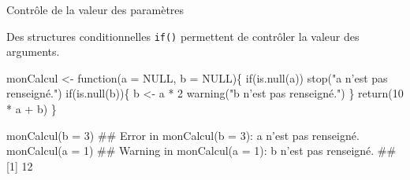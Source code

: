 \documentclass[12pt,ignorenonframetext,handout,]{beamer}
\newenvironment{Shaded}{}{}
\newcommand{\ControlFlowTok}[1]{\textcolor[rgb]{0.00,0.00,1.00}{#1}}
\newcommand{\DataTypeTok}[1]{#1}
\newcommand{\DecValTok}[1]{#1}
\newcommand{\KeywordTok}[1]{\textcolor[rgb]{0.00,0.00,1.00}{#1}}
\newcommand{\NormalTok}[1]{#1}
\newcommand{\OperatorTok}[1]{#1}
\newcommand{\OtherTok}[1]{\textcolor[rgb]{1.00,0.25,0.00}{#1}}
\newcommand{\StringTok}[1]{\textcolor[rgb]{0.00,0.50,0.50}{#1}}
\renewenvironment{Shaded}{\begin{snugshade}}{\end{snugshade}}
\begin{document}
\begin{frame}[fragile]{Contrôle de la valeur des paramètres}
\protect\hypertarget{controle-de-la-valeur-des-parametres}{}

Des structures conditionnelles \texttt{if()} permettent de contrôler la
valeur des arguments.

\pause \footnotesize

\begin{Shaded}
\begin{Highlighting}[]
\NormalTok{monCalcul <-}\StringTok{ }\ControlFlowTok{function}\NormalTok{(}\DataTypeTok{a =} \OtherTok{NULL}\NormalTok{, }\DataTypeTok{b =} \OtherTok{NULL}\NormalTok{)\{}
  \ControlFlowTok{if}\NormalTok{(}\KeywordTok{is.null}\NormalTok{(a)) }\KeywordTok{stop}\NormalTok{(}\StringTok{"a n'est pas renseigné."}\NormalTok{)}
  \ControlFlowTok{if}\NormalTok{(}\KeywordTok{is.null}\NormalTok{(b))\{}
\NormalTok{    b <-}\StringTok{ }\NormalTok{a }\OperatorTok{*}\StringTok{ }\DecValTok{2}
    \KeywordTok{warning}\NormalTok{(}\StringTok{"b n'est pas renseigné."}\NormalTok{)}
\NormalTok{  \}}
  \KeywordTok{return}\NormalTok{(}\DecValTok{10} \OperatorTok{*}\StringTok{ }\NormalTok{a }\OperatorTok{+}\StringTok{ }\NormalTok{b)}
\NormalTok{\}}

\KeywordTok{monCalcul}\NormalTok{(}\DataTypeTok{b =} \DecValTok{3}\NormalTok{)}
\NormalTok{  ## Error in monCalcul(b = 3): a n'est pas renseigné.}
\KeywordTok{monCalcul}\NormalTok{(}\DataTypeTok{a =} \DecValTok{1}\NormalTok{)}
\NormalTok{  ## Warning in monCalcul(a = 1): b n'est pas renseigné.}
\NormalTok{  ## [1] 12}
\end{Highlighting}
\end{Shaded}

\end{frame}
\end{document}
